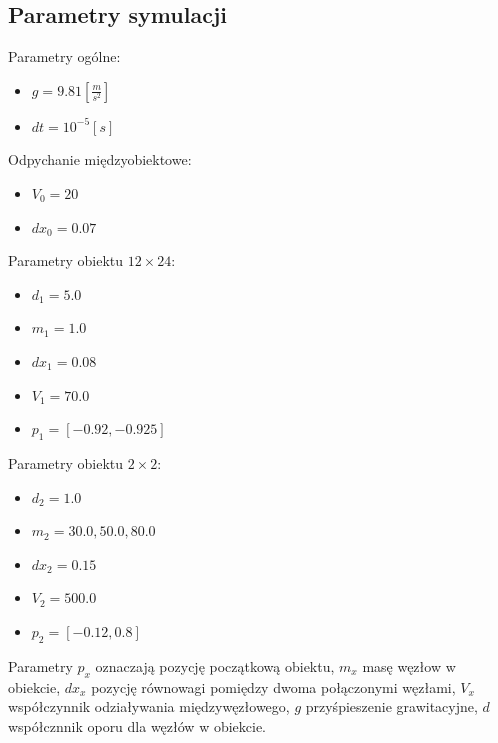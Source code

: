\documentclass[12pt, letterpaper]{report}
\begin{document}
    \subsection{Parametry symulacji}
    Parametry ogólne:
    \begin{itemize}
        \item $g = 9.81 [\frac{m}{s^2}]$
        \item $dt = 10^{-5}[s]$
    \end{itemize}
    Odpychanie międzyobiektowe:
    \begin{itemize}
        \item $V_{0} = 20$
        \item $dx_{0} = 0.07$
    \end{itemize}
    Parametry obiektu $12 \times 24$:
    \begin{itemize}
        \item $d_{1} = 5.0$
        \item $m_{1} = 1.0$
        \item $dx_{1} = 0.08$
        \item $V_{1} = 70.0$
        \item $p_{1} = [-0.92, -0.925]$
    \end{itemize}
    Parametry obiektu $2 \times 2$:
    \begin{itemize}
        \item $d_{2} = 1.0$
        \item $m_{2} = 30.0, 50.0, 80.0$
        \item $dx_{2} = 0.15$
        \item $V_{2} = 500.0$
        \item $p_{2} = [-0.12, 0.8]$
    \end{itemize}
    Parametry $p_x$ oznaczają pozycję początkową obiektu, $m_x$ masę węzłow w obiekcie, 
    $dx_x$ pozycję równowagi pomiędzy dwoma połączonymi węzłami,
    $V_x$ współczynnik odziaływania międzywęzłowego, $g$ przyśpieszenie grawitacyjne, 
    $d$ współcznnik oporu dla węzłów w obiekcie. 


    \newpage
\end{document}
